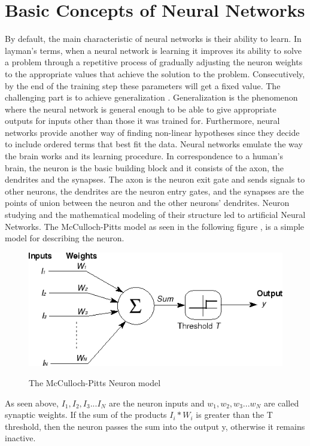 \section{Basic Concepts of Neural Networks}
By default, the main characteristic of neural networks is their ability to learn. In layman’s terms, when a neural network is learning it improves its ability to solve a problem through a repetitive process of gradually adjusting the neuron weights to the appropriate values that achieve the solution to the problem. Consecutively, by the end of the training step these parameters will get a fixed value. The challenging part is to achieve generalization \cite{liu2018r}. Generalization is the phenomenon where the neural network is general enough to be able to give appropriate outputs for inputs other than those it was trained for. Furthermore, neural networks provide another way of finding non-linear hypotheses since they decide to include ordered terms that best fit the data.
Neural networks emulate the way the brain works and its learning procedure. In correspondence to a human’s brain, the neuron is the basic building block and it consists of the axon, the dendrites and the synapses. The axon is the neuron exit gate and sends signals to other neurons, the dendrites are the neuron entry gates, and the synapses are the points of union between the neuron and the other neurons' dendrites. Neuron studying and the mathematical modeling of their structure led to artificial Neural Networks. The McCulloch-Pitts model as seen in the following figure \cite{chakrabortyoptimized}, is a simple model for describing the neuron.
\begin{figure}[h!]
\centering
\includegraphics[width=0.6\linewidth]{project/Pitts.png}
\label{fig:felix}
\caption{The McCulloch-Pitts Neuron model}
\end{figure}
\par As seen above, $I_1, I_2, I_3 ...I_N$ are the neuron inputs and $w_1, w_2, w_3...w_N$ are called synaptic weights. If the sum of the products $I_i*W_i$ is greater than the T threshold, then the neuron passes the sum into the output y, otherwise it remains inactive. 
